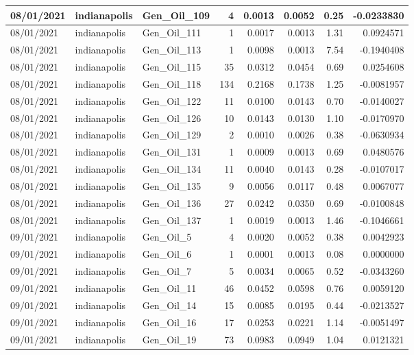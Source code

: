 \documentclass[
  letterpaper,
  DIV=11,
  numbers=noendperiod]{scrartcl}
\begin{document}
\begin{tabular}{l|l|l|r|r|r|r|r}
\hline
08/01/2021 & indianapolis & Gen\_Oil\_109 & 4 & 0.0013 & 0.0052 & 0.25 & -0.0233830\\
\hline
08/01/2021 & indianapolis & Gen\_Oil\_111 & 1 & 0.0017 & 0.0013 & 1.31 & 0.0924571\\
\hline
08/01/2021 & indianapolis & Gen\_Oil\_113 & 1 & 0.0098 & 0.0013 & 7.54 & -0.1940408\\
\hline
08/01/2021 & indianapolis & Gen\_Oil\_115 & 35 & 0.0312 & 0.0454 & 0.69 & 0.0254608\\
\hline
08/01/2021 & indianapolis & Gen\_Oil\_118 & 134 & 0.2168 & 0.1738 & 1.25 & -0.0081957\\
\hline
08/01/2021 & indianapolis & Gen\_Oil\_122 & 11 & 0.0100 & 0.0143 & 0.70 & -0.0140027\\
\hline
08/01/2021 & indianapolis & Gen\_Oil\_126 & 10 & 0.0143 & 0.0130 & 1.10 & -0.0170970\\
\hline
08/01/2021 & indianapolis & Gen\_Oil\_129 & 2 & 0.0010 & 0.0026 & 0.38 & -0.0630934\\
\hline
08/01/2021 & indianapolis & Gen\_Oil\_131 & 1 & 0.0009 & 0.0013 & 0.69 & 0.0480576\\
\hline
08/01/2021 & indianapolis & Gen\_Oil\_134 & 11 & 0.0040 & 0.0143 & 0.28 & -0.0107017\\
\hline
08/01/2021 & indianapolis & Gen\_Oil\_135 & 9 & 0.0056 & 0.0117 & 0.48 & 0.0067077\\
\hline
08/01/2021 & indianapolis & Gen\_Oil\_136 & 27 & 0.0242 & 0.0350 & 0.69 & -0.0100848\\
\hline
08/01/2021 & indianapolis & Gen\_Oil\_137 & 1 & 0.0019 & 0.0013 & 1.46 & -0.1046661\\
\hline
09/01/2021 & indianapolis & Gen\_Oil\_5 & 4 & 0.0020 & 0.0052 & 0.38 & 0.0042923\\
\hline
09/01/2021 & indianapolis & Gen\_Oil\_6 & 1 & 0.0001 & 0.0013 & 0.08 & 0.0000000\\
\hline
09/01/2021 & indianapolis & Gen\_Oil\_7 & 5 & 0.0034 & 0.0065 & 0.52 & -0.0343260\\
\hline
09/01/2021 & indianapolis & Gen\_Oil\_11 & 46 & 0.0452 & 0.0598 & 0.76 & 0.0059120\\
\hline
09/01/2021 & indianapolis & Gen\_Oil\_14 & 15 & 0.0085 & 0.0195 & 0.44 & -0.0213527\\
\hline
09/01/2021 & indianapolis & Gen\_Oil\_16 & 17 & 0.0253 & 0.0221 & 1.14 & -0.0051497\\
\hline
09/01/2021 & indianapolis & Gen\_Oil\_19 & 73 & 0.0983 & 0.0949 & 1.04 & 0.0121321\\

\end{tabular}
\end{document}
